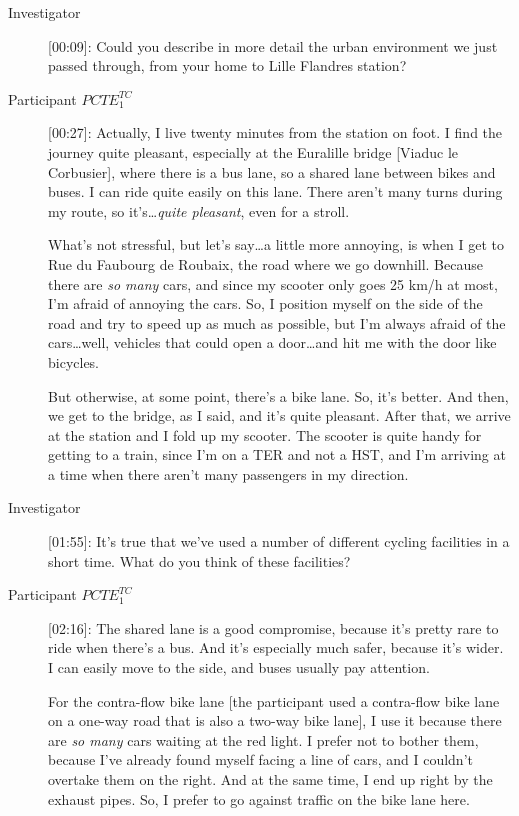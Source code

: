 \begin{description}
    \item[Investigator] [00:09]: Could you describe in more detail the urban environment we just passed through, from your home to Lille Flandres station?
    \item[Participant \(PCTE^{TC}_{1}\)] [00:27]: Actually, I live twenty minutes from the station on foot. I find the journey quite pleasant, especially at the Euralille bridge [Viaduc le Corbusier], where there is a bus lane, so a shared lane between bikes and buses. I can ride quite easily on this lane. There aren’t many turns during my route, so it’s\dots \textsl{quite pleasant}, even for a stroll.%
    
    What’s not stressful, but let’s say\dots a little more annoying, is when I get to Rue du Faubourg de Roubaix, the road where we go downhill. Because there are \textsl{so many} cars, and since my scooter only goes 25 km/h at most, I’m afraid of annoying the cars. So, I position myself on the side of the road and try to speed up as much as possible, but I’m always afraid of the cars\dots well, vehicles that could open a door\dots and hit me with the door like bicycles.%
    
    But otherwise, at some point, there’s a bike lane. So, it’s better. And then, we get to the bridge, as I said, and it’s quite pleasant. After that, we arrive at the station and I fold up my scooter. The scooter is quite handy for getting to a train, since I’m on a \acrshort{TER} and not a \acrshort{HST}, and I’m arriving at a time when there aren’t many passengers in my direction.
    \item[Investigator] [01:55]: It’s true that we’ve used a number of different cycling facilities in a short time. What do you think of these facilities?
    \item[Participant \(PCTE^{TC}_{1}\)] [02:16]: The shared lane is a good compromise, because it’s pretty rare to ride when there’s a bus. And it’s especially much safer, because it’s wider. I can easily move to the side, and buses usually pay attention.%

    For the contra-flow bike lane [the participant used a contra-flow bike lane on a one-way road that is also a two-way bike lane], I use it because there are \textsl{so many} cars waiting at the red light. I prefer not to bother them, because I’ve already found myself facing a line of cars, and I couldn’t overtake them on the right. And at the same time, I end up right by the exhaust pipes. So, I prefer to go against traffic on the bike lane here.%
    

\end{description}
